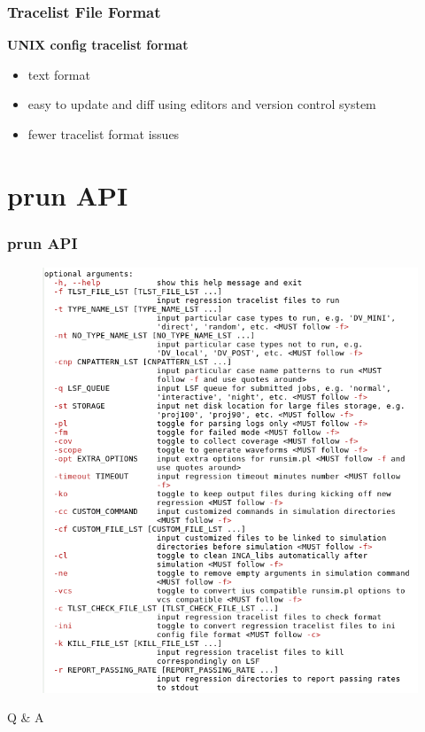 \documentclass{beamer}
\begin{document}

\begin{frame}
  \frametitle{Tracelist File Format}
  \textbf{UNIX config tracelist format}
  \begin{itemize}
  \item text format
  \item easy to update and diff using editors and version control system
  \item fewer tracelist format issues
  \end{itemize}
\end{frame}

\section{prun API}

\begin{frame}
  \frametitle{prun API}
  \begin{figure}
    \centering
    \includegraphics[width=0.54\linewidth]{prun_api}
  \end{figure}
\end{frame}


\begin{frame}
  \Huge{\centerline{Q \& A}}
\end{frame}

\end{document}
